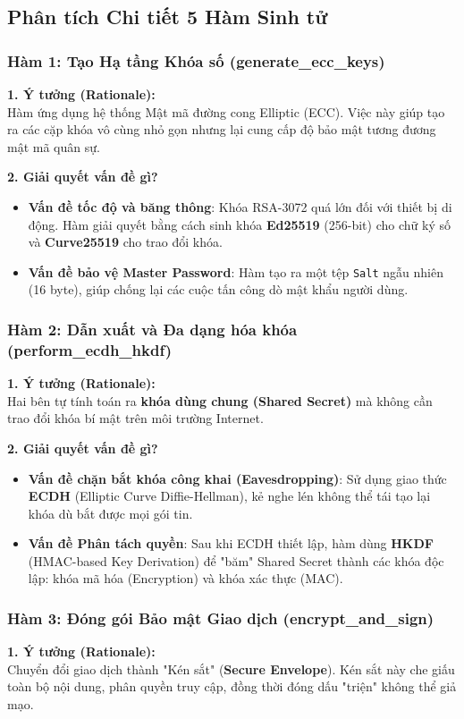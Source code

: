 \documentclass[11pt,a4paper]{article}
\begin{document}
\subsection{Phân tích Chi tiết 5 Hàm Sinh tử}

\subsubsection{Hàm 1: Tạo Hạ tầng Khóa số (generate\_ecc\_keys)}
\textbf{1. Ý tưởng (Rationale):} \\
Hàm ứng dụng hệ thống Mật mã đường cong Elliptic (ECC). Việc này giúp tạo ra các cặp khóa vô cùng nhỏ gọn nhưng lại cung cấp độ bảo mật tương đương mật mã quân sự.

\textbf{2. Giải quyết vấn đề gì?}
\begin{itemize}[noitemsep]
    \item \textbf{Vấn đề tốc độ và băng thông}: Khóa RSA-3072 quá lớn đối với thiết bị di động. Hàm giải quyết bằng cách sinh khóa \textbf{Ed25519} (256-bit) cho chữ ký số và \textbf{Curve25519} cho trao đổi khóa.
    \item \textbf{Vấn đề bảo vệ Master Password}: Hàm tạo ra một tệp \texttt{Salt} ngẫu nhiên (16 byte), giúp chống lại các cuộc tấn công dò mật khẩu người dùng.
\end{itemize}

\subsubsection{Hàm 2: Dẫn xuất và Đa dạng hóa khóa (perform\_ecdh\_hkdf)}
\textbf{1. Ý tưởng (Rationale):} \\
Hai bên tự tính toán ra \textbf{khóa dùng chung (Shared Secret)} mà không cần trao đổi khóa bí mật trên môi trường Internet.

\textbf{2. Giải quyết vấn đề gì?}
\begin{itemize}[noitemsep]
    \item \textbf{Vấn đề chặn bắt khóa công khai (Eavesdropping)}: Sử dụng giao thức \textbf{ECDH} (Elliptic Curve Diffie-Hellman), kẻ nghe lén không thể tái tạo lại khóa dù bắt được mọi gói tin.
    \item \textbf{Vấn đề Phân tách quyền}: Sau khi ECDH thiết lập, hàm dùng \textbf{HKDF} (HMAC-based Key Derivation) để "băm" Shared Secret thành các khóa độc lập: khóa mã hóa (Encryption) và khóa xác thực (MAC).
\end{itemize}

\subsubsection{Hàm 3: Đóng gói Bảo mật Giao dịch (encrypt\_and\_sign)}
\textbf{1. Ý tưởng (Rationale):} \\
Chuyển đổi giao dịch thành "Kén sắt" (\textbf{Secure Envelope}). Kén sắt này che giấu toàn bộ nội dung, phân quyền truy cập, đồng thời đóng dấu "triện" không thể giả mạo.
\end{document}
